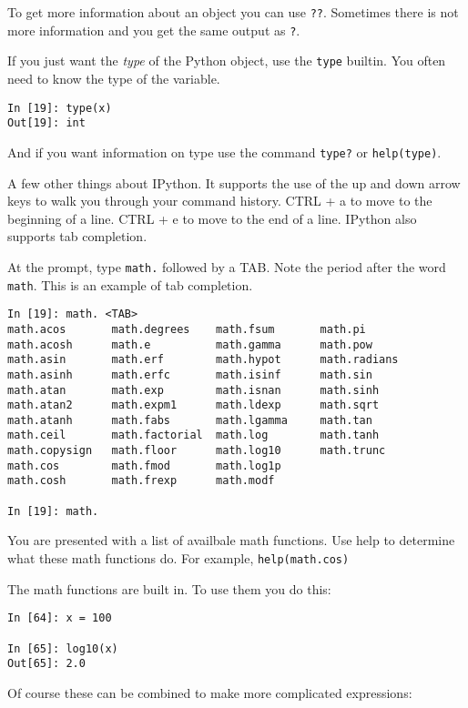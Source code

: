 \documentclass[12pt]{article}
\begin{document}
To get more information about an object you can use \texttt{??}. Sometimes there is not more information and you get the same output as \texttt{?}. 

If you just want the \emph{type} of the Python object, use the \texttt{type} builtin. You often need to know the type of the variable.

\begin{lstlisting}[style=bash]
In [19]: type(x)
Out[19]: int
\end{lstlisting}

And if you want information on type use the command \texttt{type?} or \texttt{help(type)}.

A few other things about IPython. It supports the use of the up and down arrow keys to walk you through your command history. CTRL + a to move to the beginning of a line. CTRL + e to move to the end of a line. IPython also supports tab completion.

At the prompt, type \texttt{math.} followed by a TAB. Note the period after the word \texttt{math}. This is an example of tab completion.

\begin{lstlisting}[style=bash]
In [19]: math. <TAB>
math.acos       math.degrees    math.fsum       math.pi
math.acosh      math.e          math.gamma      math.pow
math.asin       math.erf        math.hypot      math.radians
math.asinh      math.erfc       math.isinf      math.sin
math.atan       math.exp        math.isnan      math.sinh
math.atan2      math.expm1      math.ldexp      math.sqrt
math.atanh      math.fabs       math.lgamma     math.tan
math.ceil       math.factorial  math.log        math.tanh
math.copysign   math.floor      math.log10      math.trunc
math.cos        math.fmod       math.log1p      
math.cosh       math.frexp      math.modf       

In [19]: math.
\end{lstlisting}

You are presented with a list of availbale math functions. Use help to determine what these math functions do. For example, \texttt{help(math.cos)}

The math functions are built in. To use them you do this:
\begin{lstlisting}[style=bash]
In [64]: x = 100

In [65]: log10(x) 
Out[65]: 2.0
\end{lstlisting}

Of course these can be combined to make more complicated expressions:
\end{document}
